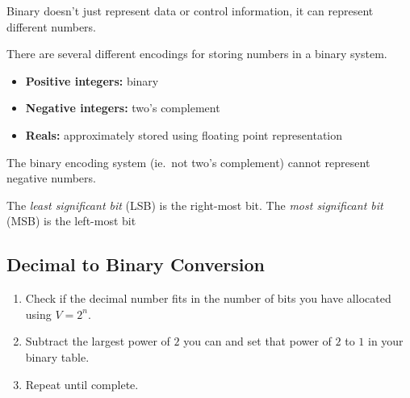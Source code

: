 Binary doesn't just represent data or control information, it can represent different numbers.

There are several different encodings for storing numbers in a binary system.
\begin{itemize}
	\item \textbf{Positive integers:} binary
	\item \textbf{Negative integers:} two's complement
	\item \textbf{Reals:} approximately stored using floating point representation
\end{itemize}

\begin{note}
	The binary encoding system (ie.\ not two's complement) cannot represent negative numbers.
\end{note}

The \emph{least significant bit} (LSB) is the right-most bit.
The \emph{most significant bit} (MSB) is the left-most bit

\subsection{Decimal to Binary Conversion}\label{sub:decimal_to_binary_conversion}

\begin{enumerate}
	\item Check if the decimal number fits in the number of bits you have allocated using \(V=2^n\).
	\item Subtract the largest power of \(2\) you can and set that power of \(2\) to \(1\) in your binary table.
	\item Repeat until complete.
\end{enumerate}

